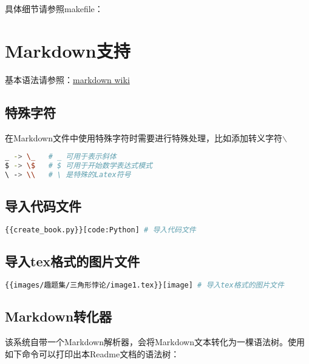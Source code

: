 \documentclass[12pt, letterpaper]{ctexrep}
\begin{document}
具体细节请参照makefile：



\chapter{Markdown支持}

基本语法请参照：\href{https://simplemde.com/markdown-guide}{markdown wiki}

\section{特殊字符}

在Markdown文件中使用特殊字符时需要进行特殊处理，比如添加转义字符$\backslash$
\begin{lstlisting}[language=Bash]
_ -> \_   # _ 可用于表示斜体
$ -> \$   # $ 可用于开始数学表达式模式
\ -> \\   # \ 是特殊的Latex符号
\end{lstlisting}

\section{导入代码文件}

\begin{lstlisting}[language=Bash]
{{create_book.py}}[code:Python] # 导入代码文件
\end{lstlisting}



\section{导入tex格式的图片文件}

\begin{lstlisting}[language=Bash]
{{images/趣题集/三角形悖论/image1.tex}}[image] # 导入tex格式的图片文件
\end{lstlisting}

\begin{center}

\end{center}

\section{Markdown转化器}
该系统自带一个Markdown解析器，会将Markdown文本转化为一棵语法树。使用如下命令可以打印出本Readme文档的语法树：
\end{document}
